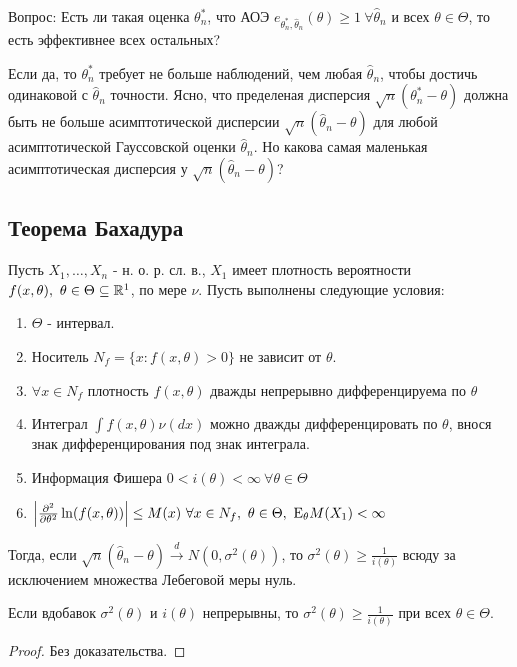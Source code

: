 Вопрос: Есть ли такая оценка \(\theta^*_n\), что АОЭ \(e_{\theta^*_n, \widehat{\theta}_n}(\theta) \geq 1 \ \forall \widehat{\theta}_n\)
и всех \(\theta \in \Theta\), то есть эффективнее всех остальных?

Если да, то \(\theta^*_n\) требует не больше наблюдений, чем любая \(\widehat{\theta}_n\), чтобы достичь одинаковой с \(\widehat{\theta}_n\) точности.
Ясно, что пределеная дисперсия \(\sqrt{n}(\theta^*_n - \theta)\) должна быть не больше асимптотической дисперсии
\(\sqrt{n}(\widehat{\theta}_n - \theta)\) для любой асимптотической Гауссовской оценки \(\widehat{\theta}_n\). Но
какова самая маленькая асимптотическая дисперсия у \(\sqrt{n}(\widehat{\theta}_n - \theta)\)?

\subsection{Теорема Бахадура}
Пусть \(X_1, \ldots, X_n\) - н. о. р. сл. в., \(X_1\) имеет
плотность вероятности \(f(x, \theta),\ \theta \in \Theta \subseteq \R^1\),
по мере \(\nu\). Пусть выполнены следующие условия:
\begin{enumerate}
    \item \(\Theta\) - интервал.
    \item Носитель \(N_f = \{x: f(x, \theta) > 0\}\) не зависит от \(\theta\).
    \item \label{th::bahadur:density} \(\forall x \in N_f\) плотность \(f(x, \theta)\) дважды непрерывно
        дифференцируема по \(\theta\)
    \item \label{th::bahadur:integral} Интеграл \(\int f(x, \theta)\nu(dx)\)  можно
        дважды дифференцировать по \(\theta\), внося знак
        дифференцирования под знак интеграла.
    \item Информация Фишера \(0 < i(\theta) < \infty \ \forall \theta \in \Theta\)
    \item \label{th::bahadur:second_partial} \(\left\lvert \frac{\partial^2}{\partial \theta^2} \ln(f(x, \theta)) \right\rvert  \leq M(x) \ \forall x \in N_f, \ \theta \in \Theta, \ \mathrm{E}_\theta M(X_1) < \infty\)
\end{enumerate}
Тогда, если \(\sqrt{n}(\widehat{\theta}_n - \theta) \xrightarrow{d} N(0, \sigma^2(\theta))\),
то \(\sigma^2(\theta) \geq \frac{1}{i(\theta)}\) всюду за исключением
множества Лебеговой меры нуль.
\begin{remark}
    Если вдобавок \(\sigma^2(\theta)\) и \(i(\theta)\) непрерывны,
    то \(\sigma^2(\theta) \geq \frac{1}{i(\theta)}\) при всех \(\theta \in \Theta\).
\end{remark}
\begin{proof}
    Без доказательства.
\end{proof}

